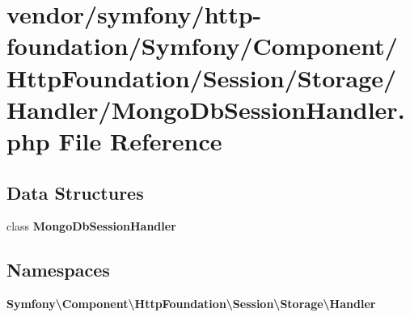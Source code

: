 \section{vendor/symfony/http-\/foundation/\+Symfony/\+Component/\+Http\+Foundation/\+Session/\+Storage/\+Handler/\+Mongo\+Db\+Session\+Handler.php File Reference}
\label{_mongo_db_session_handler_8php}
\subsection*{Data Structures}
\begin{DoxyCompactItemize}
\item 
class {\bf Mongo\+Db\+Session\+Handler}
\end{DoxyCompactItemize}
\subsection*{Namespaces}
\begin{DoxyCompactItemize}
\item 
 {\bf Symfony\textbackslash{}\+Component\textbackslash{}\+Http\+Foundation\textbackslash{}\+Session\textbackslash{}\+Storage\textbackslash{}\+Handler}
\end{DoxyCompactItemize}
